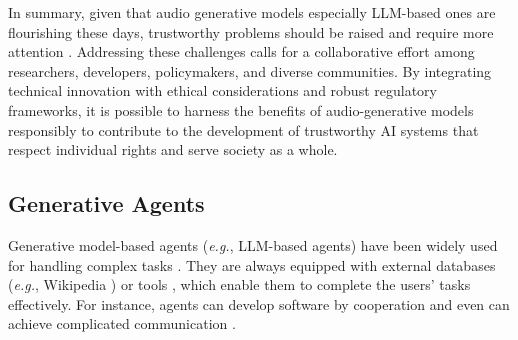 In summary, given that audio generative models especially LLM-based ones are flourishing these days, trustworthy problems should be raised and require more attention \citep{hurst2024gpt}. Addressing these challenges calls for a collaborative effort among researchers, developers, policymakers, and diverse communities. By integrating technical innovation with ethical considerations and robust regulatory frameworks, it is possible to harness the benefits of audio-generative models responsibly to contribute to the development of trustworthy AI systems that respect individual rights and serve society as a whole.

\subsection{Generative Agents}

Generative model-based agents (\emph{e.g.}, LLM-based agents) have been widely used for handling complex tasks \cite{wang2024survey, pan2024autonomous, nasiriany2024pivot, liu2024visualagentbench, cao2024spider2, koh2024visualwebarena}. They are always equipped with external databases (\emph{e.g.}, Wikipedia \cite{shao2024assisting}) or tools \cite{metatool, qin2023toolllm, ling2023international, yang2024gpt4tools, zheng2024gpt, koh2024visualwebarena}, which enable them to complete the users' tasks effectively. For instance, agents can develop software by cooperation \cite{chatdev} and even can achieve complicated communication \cite{chen2024internet, li2023metaagents}.

